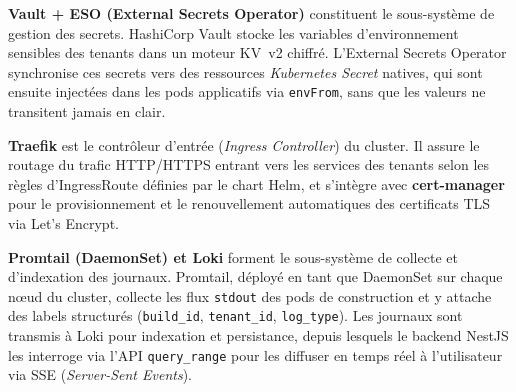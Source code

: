 \textbf{Vault + ESO (External Secrets Operator)} constituent le sous-système de gestion des secrets. HashiCorp Vault stocke les variables d'environnement sensibles des tenants dans un moteur KV~v2 chiffré. L'External Secrets Operator synchronise ces secrets vers des ressources \textit{Kubernetes Secret} natives, qui sont ensuite injectées dans les pods applicatifs via \texttt{envFrom}, sans que les valeurs ne transitent jamais en clair.

\textbf{Traefik} est le contrôleur d'entrée (\textit{Ingress Controller}) du cluster. Il assure le routage du trafic HTTP/HTTPS entrant vers les services des tenants selon les règles d'IngressRoute définies par le chart Helm, et s'intègre avec \textbf{cert-manager} pour le provisionnement et le renouvellement automatiques des certificats TLS via Let's Encrypt.

\textbf{Promtail (DaemonSet) et Loki} forment le sous-système de collecte et d'indexation des journaux. Promtail, déployé en tant que DaemonSet sur chaque nœud du cluster, collecte les flux \texttt{stdout} des pods de construction et y attache des labels structurés (\texttt{build\_id}, \texttt{tenant\_id}, \texttt{log\_type}). Les journaux sont transmis à Loki pour indexation et persistance, depuis lesquels le backend NestJS les interroge via l'API \texttt{query\_range} pour les diffuser en temps réel à l'utilisateur via SSE (\textit{Server-Sent Events}).

